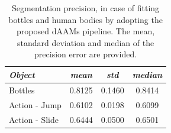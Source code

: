 \begin{table}[!h]
\small
\centering
\begin{tabular}{|l|c|c|c|}
\hline
\emph{Object}   & \emph{mean} & \emph{std} & \emph{median}\\
\hline\hline
Bottles         & 0.8125      & 0.1460     & 0.8414\\
Action - Jump   & 0.6102      & 0.0198     & 0.6099\\
Action - Slide  & 0.6444      & 0.0500     & 0.6501\\
\hline
\end{tabular}
\caption{Segmentation precision, in case of fitting bottles and human bodies by adopting the proposed dAAMs pipeline. The mean, standard deviation and median of the precision error are provided.}
\label{tab:seg_result}
\end{table}